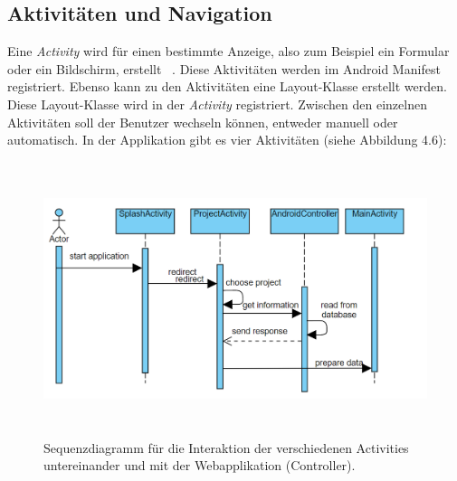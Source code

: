 \subsection{Aktivitäten und Navigation}
Eine \textit{Activity} wird für einen bestimmte Anzeige, also zum Beispiel ein Formular oder ein Bildschirm, erstellt ~\parencite{mednieks2012programming}. Diese Aktivitäten werden im Android Manifest registriert. Ebenso kann zu den Aktivitäten eine Layout-Klasse erstellt werden. Diese Layout-Klasse wird in der \textit{Activity} registriert. Zwischen den einzelnen Aktivitäten soll der Benutzer wechseln können, entweder manuell oder automatisch. In der Applikation gibt es vier Aktivitäten (siehe Abbildung 4.6):
\begin{figure}[tp]
  \centering
  \includegraphics[height=8cm]{images/seqAct.PNG}
 \caption[Sequenzdiagramm für die Interaktion der verschiedenen Activities untereinander und mit der Webapplikation.]{Sequenzdiagramm für die Interaktion der verschiedenen Activities untereinander und mit der Webapplikation (Controller).}
  \label{fig:popup}
\end{figure}
